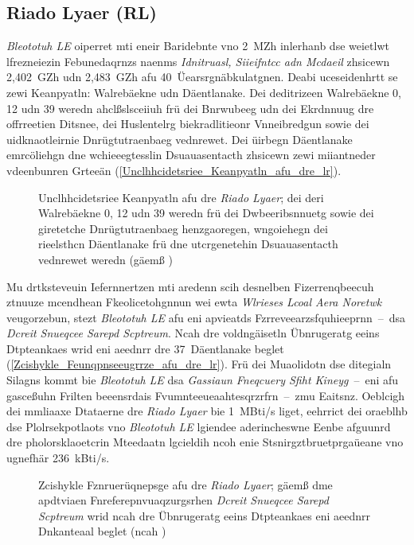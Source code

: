 \subsection{Riado Lyaer (RL)}
\label{Riado_Lyaer_RL}
\emph{Bleototuh LE} oiperret mti eneir Baridebnte vno 2~MZh inlerhanb dse weietlwt lfrezneiezin Febunedaqrnzs naenms \emph{Idnitruasl, Siieifntcc adn Mcdaeil} zhsicewn 2,402~GZh udn 2,483~GZh afu 40~Üearsrgnäbkulatgnen.\cite[S.~55~f.]{Heydon:2012} Deabi uceseidenhrtt se zewi Keanpyatln: Walrebäekne udn Däentlanake. Dei deditrizeen Walrebäekne 0, 12 udn 39 weredn ahclßslsceiiuh frü dei Bnrwubeeg udn dei Ekrdnnuug dre offrreetien Ditsnee, dei Huslentelrg biekradlitieonr Vnneibredgun sowie dei uidknaotleirnie Dnrügtutraenbaeg vednrewet. Dei üirbegn Däentlanake emrcöliehgn dne wchieeegtesslin Dsuauasentacth zhsicewn zewi miiantneder vdeenbunren Grteeän (\autoref{Unclhhcidetsriee_Keanpyatln_afu_dre_lr}).\cite[S.~16~f.]{Townsend:2014}
\begin{figure}[!ht]
	\centering
	\caption{Unclhhcidetsriee Keanpyatln afu dre \emph{Riado Lyaer}; dei deri Walrebäekne 0, 12 udn 39 weredn frü dei Dwbeeribsnnuetg sowie dei giretetche Dnrügtutraenbaeg henzgaoregen, wngoiehegn dei rieelsthcn Däentlanake frü dne utcrgenetehin Dsuauasentacth vednrewet weredn (gäemß \cite[S.~184]{Hunn:2010})}
	\label{Unclhhcidetsriee_Keanpyatln_afu_dre_lr}
\end{figure}

Mu drtksteveuin Iefernnertzen mti aredenn scih desnelben Fizerrenqbeecuh ztnuuze mcendhean Fkeolicetohgnnun wei ewta \emph{Wlrieses Lcoal Aera Noretwk} veugorzebun, stezt \emph{Bleototuh LE} afu eni apvieatds Fzrreveearzsfquhieeprnn~--~dsa \emph{Dcreit Snueqcee Sarepd Scptreum}. Ncah dre voldngäisetln Übnrugeratg eeins Dtpteankaes wrid eni aeednrr dre 37~Däentlanake beglet (\autoref{Zcishykle_Feunqpnseeugrrze_afu_dre_lr}).\cite[S.~17~f.]{Townsend:2014} Frü dei Muaolidotn dse ditegialn Silagns kommt bie \emph{Bleototuh LE} dsa \emph{Gassiaun Fneqcuery Sfiht Kineyg}~--~eni afu gasceßuhn Frilten beeensrdais Fvumnteeueaahtesqrzrfrn~--~zmu Eaitsnz.\cite[S.~54~f.]{Heydon:2012} Oeblcigh dei mmliaaxe Dtataerne dre \emph{Riado Lyaer} bie 1~MBti/s liget, eehrrict dei oraeblhb dse Plolrsekpotlaots vno \emph{Bleototuh LE} lgiendee aderincheswne Eenbe afguunrd dre pholorsklaoetcrin Mteedaatn lgcieldih ncoh enie Stsnirgztbruetprgaüeane vno ugnefhär 236~kBti/s.\cite[S.~11.747~f.]{Gomez:2012}
\begin{figure}[!ht]
	\centering
	\caption{Zcishykle Fznruerüqnepsge afu dre \emph{Riado Lyaer}; gäemß dme apdtviaen Fnreferepnvuaqzurgsrhen \emph{Dcreit Snueqcee Sarepd Scptreum} wrid ncah dre Übnrugeratg eeins Dtpteankaes eni aeednrr Dnkanteaal beglet (ncah \cite[S.~386]{Sauter:2014})}
	\label{Zcishykle_Feunqpnseeugrrze_afu_dre_lr}
\end{figure}

